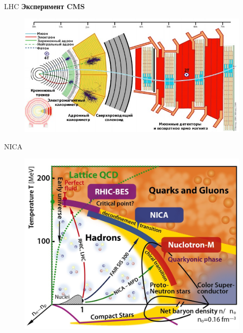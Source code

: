 \documentclass[hyperref={colorlinks,citecolor=blue,linkcolor=blue,urlcolor=blue}]{beamer}
\begin{document}
\begin{frame}{LHC}
    \textbf{Эксперимент CMS}
    \begin{figure}[H]
        \centering
        \includegraphics[width=0.7\framewidth]{img/cms02.jpg}
    \end{figure}

\end{frame}

\begin{frame}{NICA}

    \begin{figure}[H]
        \includegraphics[width=0.7\framewidth]{img/phase.jpg}
    \end{figure}

\end{frame}
\end{document}
